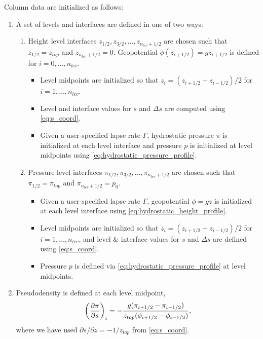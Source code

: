 Column data are initialized as follows:
\begin{enumerate}
  \item A set of levels and interfaces are defined in one of two ways:
  \begin{enumerate}
    \item Height level interfaces $z_{1/2}, z_{3/2}, \dotsc, z_{n_{lev}+1/2}$  are chosen such that $z_{1/2} = z_{top}$ and $z_{n_{lev}+1/2} = 0$.
        Geopotential $\phi(z_{i+1/2}) = g z_{i+1/2}$ is defined for $i=0,\dotsc,n_{lev}$.
    \begin{itemize}
      \item Level midpoints are initialized so that $z_i = (z_{i+1/2} + z_{i-1/2})/2$ for $i=1,\dotsc,n_{lev}$. 
      \item Level and interface values for $s$ and $\Delta s$ are computed using \eqref{eq:s_coord}.
      \item Given a user-specified lapse rate $\Gamma$, hydrostatic pressure $\pi$ is initialized at each level interface and pressure $p$ is initialized at level midpoints using \eqref{eq:hydrostatic_pressure_profile}.
    \end{itemize}
    \item Pressure level interfaces $\pi_{1/2}, \pi_{3/2}, \dotsc, \pi_{n_{lev}+1/2}$  are chosen such that $\pi_{1/2} = \pi_{top}$ and $\pi_{n_{lev}+1/2} = p_0$.
    \begin{itemize}
      \item Given a user-specified lapse rate $\Gamma$, geopotential $\phi=gz$ is initialized at each level interface using \eqref{eq:hydrostatic_height_profile}.
      \item Level midpoints are initialized so that $z_i = (z_{i+1/2} + z_{i-1/2})/2$ for $i=1,\dotsc,n_{lev}$, and level \& interface values for $s$ and $\Delta s$ are defined using \eqref{eq:s_coord}.
      \item Pressure $p$ is defined via \eqref{eq:hydrostatic_pressure_profile} at level midpoints. 
    \end{itemize}
  \end{enumerate}
  \item Pseudodensity is defined at each level midpoint,
    \begin{equation}
      \left(\frac{\partial \pi }{\partial s}\right)_i = -\frac{g(\pi_{i+1/2}-\pi_{i-1/2})}{z_{top}(\phi_{i+1/2}-\phi_{i-1/2})},
    \end{equation}
    where we have used $\partial s / \partial z = - 1 /z_{top}$ from \eqref{eq:s_coord}.

\end{enumerate}
